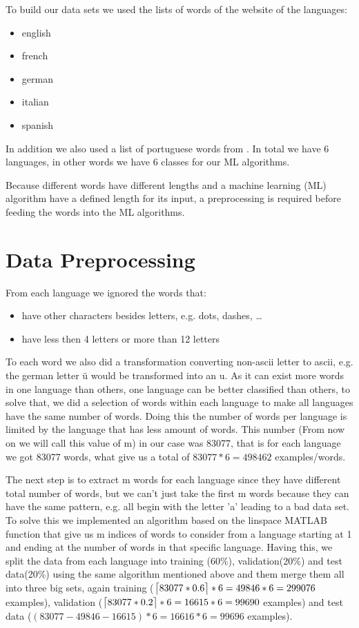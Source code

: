 \documentclass[journal, a4paper]{IEEEtran}
\DeclarePairedDelimiter{\ceil}{\lceil}{\rceil}
\begin{document}
    To build our data sets we used the lists of words of the website \cite{website} of the languages:
    \begin{itemize}
      \item english
      \item french
      \item german
      \item italian
      \item spanish
    \end{itemize}
    In addition we also used a list of portuguese words from \cite{website2}. In total we have 6 
languages, in other words we have 6 classes for our ML algorithms.

    Because different words have different lengths and a machine learning (ML) algorithm have a 
defined length for its input, a preprocessing is required before feeding the words into the ML 
algorithms.

\section{Data Preprocessing}
    From each language we ignored the words that:
    \begin{itemize}
      \item have other characters besides letters, e.g. dots, dashes, \ldots
      \item have less then 4 letters or more than 12 letters
    \end{itemize}
    To each word we also did a transformation converting non-ascii letter to ascii,
e.g. the german letter ü would be transformed into an u.
    As it can exist more words in one language than others, one language can be better classified 
than others, to solve that, we did a selection of words within each language to make all languages 
have the same number of words. Doing this the number of words per language is limited by the 
language that has less amount of words. This number (From now on we will call this value of m) 
in our case was 83077, that is for each language we got 83077 words, what give us a total of 
\(83077*6=498462\) examples/words.

    The next step is to extract m words for each language since they have different total number 
of words, but we can't just take the first m words because they can have the same pattern, e.g. 
all begin with the letter 'a' leading to a bad data set. To solve this we implemented an algorithm 
based on the linspace MATLAB function that give us m indices of words to consider from a language 
starting at 1 and ending at the number of words in that specific language.
    Having this, we split the data from each language into training (60\%), validation(20\%) 
and test data(20\%) using the same algorithm mentioned above and them merge them all into 
three big sets, again training (\(\ceil[\big]{83077*0.6}*6=49846*6=299076\) examples), validation 
(\(\ceil[\big]{83077*0.2}*6=16615*6=99690\) examples) and test data 
(\((83077-49846-16615)*6=16616*6=99696\) examples).
\end{document}
